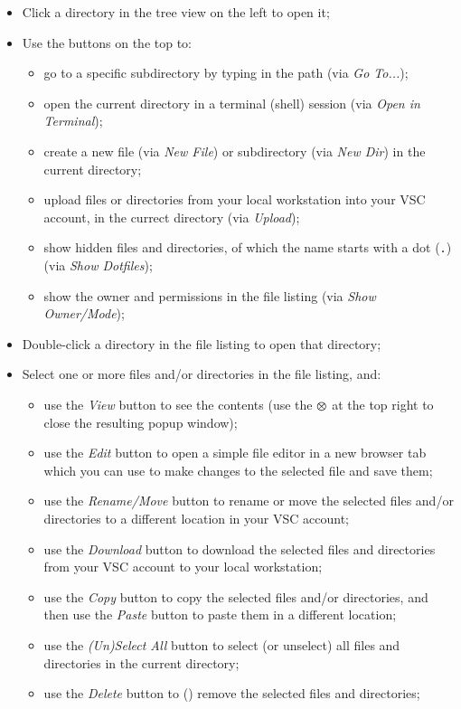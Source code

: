 \begin{itemize}
    \item Click a directory in the tree view on the left to open it;
    \item Use the buttons on the top to:
    \begin{itemize}
        \item go to a specific subdirectory by typing in the path (via \emph{Go To...});
        \item open the current directory in a terminal (shell) session (via \emph{Open in Terminal});
        \item create a new file (via \emph{New File}) or subdirectory (via \emph{New Dir}) in the current directory;
        \item upload files or directories from your local workstation into your VSC account, in the currect directory (via \emph{Upload});
        \item show hidden files and directories, of which the name starts with a dot (\lstinline|.|) (via \emph{Show Dotfiles});
        \item show the owner and permissions in the file listing (via \emph{Show Owner/Mode});
    \end{itemize}
    \item Double-click a directory in the file listing to open that directory;
    \item Select one or more files and/or directories in the file listing, and:
    \begin{itemize}
        \item use the \emph{View} button to see the contents (use the $\varotimes$ at the top right to close the resulting popup window);
        \item use the \emph{Edit} button to open a simple file editor in a new browser tab which you can use to make changes to the selected file and save them;
        \item use the \emph{Rename/Move} button to rename or move the selected files and/or directories to a different location in your VSC account;
        \item use the \emph{Download} button to download the selected files and directories from your VSC account to your local workstation;
        \item use the \emph{Copy} button to copy the selected files and/or directories, and then use the \emph{Paste} button to paste them in a different location;
        \item use the \emph{(Un)Select All} button to select (or unselect) all files and directories in the current directory;
        \item use the \emph{Delete} button to () remove the selected files and directories;
    \end{itemize}
\end{itemize}

